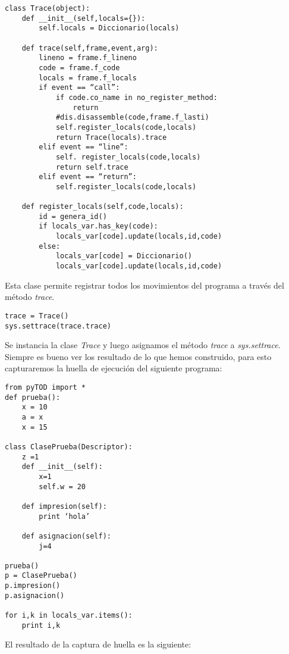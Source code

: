 \documentclass[10pt,a4paper]{article}
\begin{document}
\begin{verbatim}
class Trace(object):
    def __init__(self,locals={}):
        self.locals = Diccionario(locals)

    def trace(self,frame,event,arg):
        lineno = frame.f_lineno
        code = frame.f_code
        locals = frame.f_locals
        if event == “call”:
            if code.co_name in no_register_method:
                return
            #dis.disassemble(code,frame.f_lasti)
            self.register_locals(code,locals)
            return Trace(locals).trace
        elif event == “line”:
            self. register_locals(code,locals)
            return self.trace
        elif event == “return”:
            self.register_locals(code,locals)

    def register_locals(self,code,locals):
        id = genera_id()
        if locals_var.has_key(code):
            locals_var[code].update(locals,id,code)
        else:
            locals_var[code] = Diccionario()
            locals_var[code].update(locals,id,code)
\end{verbatim}

Esta clase permite registrar todos los movimientos del programa a través del método \textit{trace}.

\begin{verbatim}
trace = Trace()
sys.settrace(trace.trace)
\end{verbatim}

Se instancia la clase \textit{Trace} y luego asignamos el método \textit{trace} a \textit{sys.settrace}.\\

Siempre es bueno ver los resultado de lo que hemos construido, para esto capturaremos la huella de ejecución del siguiente programa:

\begin{verbatim}
from pyTOD import *
def prueba():
    x = 10
    a = x
    x = 15

class ClasePrueba(Descriptor):
    z =1
    def __init__(self):
        x=1
        self.w = 20

    def impresion(self):
        print ‘hola’

    def asignacion(self):
        j=4

prueba()
p = ClasePrueba()
p.impresion()
p.asignacion()

for i,k in locals_var.items():
    print i,k
\end{verbatim}

\pagebreak
El resultado de la captura de huella es la siguiente:
\end{document}
